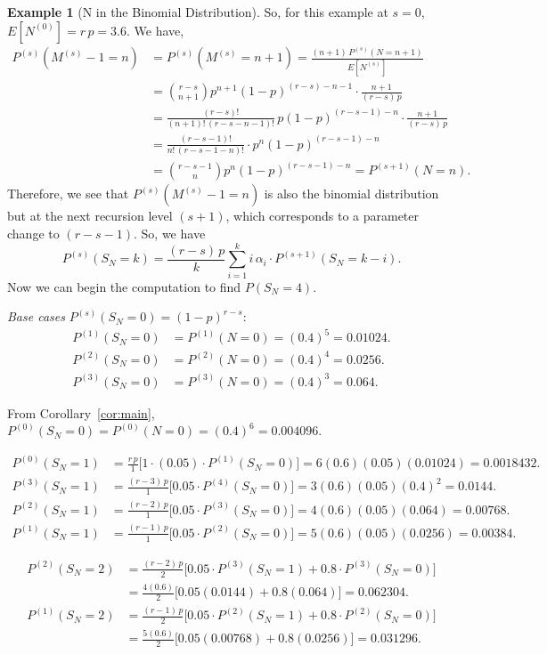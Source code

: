 \documentclass[11pt]{amsart}
\theoremstyle{definition}
\newtheorem{example}{Example}
\theoremstyle{plain}
\begin{document}
\begin{example}[N in the Binomial Distribution]
So, for this example at $s = 0$, $E[N^{(0)}] = r\,p = 3.6$.  We have,
\begin{align*}
P^{(s)}(M^{(s)} - 1 = n)
    &= P^{(s)}(M^{(s)} = n + 1)
     = \frac{(n+1)\,P^{(s)}(N = n + 1)}{E[N^{(s)}]} \\
    &= \binom{r-s}{n+1} p^{n+1}(1-p)^{(r-s)-n-1}
       \cdot \frac{n+1}{(r-s)\,p} \\
    &= \frac{(r-s)!}{(n+1)!\,(r-s-n-1)!}\,p(1-p)^{(r-s-1)-n}
       \cdot \frac{n+1}{(r-s)\,p} \\
    &= \frac{(r-s-1)!}{n!\,(r-s-1-n)!} \cdot p^n (1-p)^{(r-s-1)-n} \\
    &= \binom{r-s-1}{n} p^n (1-p)^{(r-s-1)-n}
     = P^{(s+1)}(N = n).
\end{align*}
Therefore, we see that $P^{(s)}(M^{(s)} - 1 = n)$ is also the binomial distribution but at
the next recursion level $(s + 1)$, which corresponds to a parameter change to $(r - s - 1)$.
So, we have
\[
    P^{(s)}(S_N = k)
    = \frac{(r-s)\,p}{k} \sum_{i=1}^{k} i\,\alpha_i \cdot P^{(s+1)}(S_N = k - i).
\]
Now we can begin the computation to find $P(S_N = 4)$.

\medskip
\noindent\textit{Base cases} $P^{(s)}(S_N = 0) = (1-p)^{r-s}$:
\begin{align*}
P^{(1)}(S_N = 0) &= P^{(1)}(N = 0) = (0.4)^5 = 0.01024. \\
P^{(2)}(S_N = 0) &= P^{(2)}(N = 0) = (0.4)^4 = 0.0256. \\
P^{(3)}(S_N = 0) &= P^{(3)}(N = 0) = (0.4)^3 = 0.064.
\end{align*}

\medskip
\noindent
From Corollary~\ref{cor:main}, $P^{(0)}(S_N = 0) = P^{(0)}(N = 0) = (0.4)^6 = 0.004096$.

\begin{align*}
P^{(0)}(S_N = 1)
    &= \frac{r\,p}{1}\bigl[1 \cdot (0.05) \cdot P^{(1)}(S_N = 0)\bigr]
     = 6(0.6)(0.05)(0.01024) = 0.0018432. \\
P^{(3)}(S_N = 1)
    &= \frac{(r-3)\,p}{1}\bigl[0.05 \cdot P^{(4)}(S_N = 0)\bigr]
     = 3(0.6)(0.05)(0.4)^2 = 0.0144. \\
P^{(2)}(S_N = 1)
    &= \frac{(r-2)\,p}{1}\bigl[0.05 \cdot P^{(3)}(S_N = 0)\bigr]
     = 4(0.6)(0.05)(0.064) = 0.00768. \\
P^{(1)}(S_N = 1)
    &= \frac{(r-1)\,p}{1}\bigl[0.05 \cdot P^{(2)}(S_N = 0)\bigr]
     = 5(0.6)(0.05)(0.0256) = 0.00384.
\end{align*}

\begin{align*}
P^{(2)}(S_N = 2)
    &= \frac{(r-2)\,p}{2}
       \bigl[0.05 \cdot P^{(3)}(S_N = 1) + 0.8 \cdot P^{(3)}(S_N = 0)\bigr] \\
    &= \frac{4(0.6)}{2}\bigl[0.05(0.0144) + 0.8(0.064)\bigr]
     = 0.062304. \\
P^{(1)}(S_N = 2)
    &= \frac{(r-1)\,p}{2}
       \bigl[0.05 \cdot P^{(2)}(S_N = 1) + 0.8 \cdot P^{(2)}(S_N = 0)\bigr] \\
    &= \frac{5(0.6)}{2}\bigl[0.05(0.00768) + 0.8(0.0256)\bigr]
     = 0.031296.
\end{align*}


\end{example}
\end{document}
